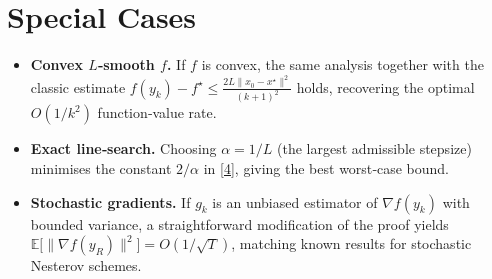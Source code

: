 \documentclass{article}
\begin{document}
\section*{Special Cases}
\begin{itemize}
\item \textbf{Convex $L$‑smooth $f$.}  
If $f$ is convex, the same analysis together with the classic estimate
$f(y_k)-f^\star\le \frac{2L\|x_0-x^\star\|^2}{(k+1)^2}$ holds, recovering the optimal $O(1/k^2)$ function‑value rate.

\item \textbf{Exact line‑search.}  
Choosing $\alpha=1/L$ (the largest admissible stepsize) minimises the constant $2/\alpha$ in \eqref{4}, giving the best worst‑case bound.

\item \textbf{Stochastic gradients.}  
If $g_k$ is an unbiased estimator of $\nabla f(y_k)$ with bounded variance, a straightforward modification of the proof yields
$\mathbb{E}\bigl[\|\nabla f(y_R)\|^2\bigr]=O(1/\sqrt{T})$, matching known results for stochastic Nesterov schemes.
\end{itemize}
\end{document}
